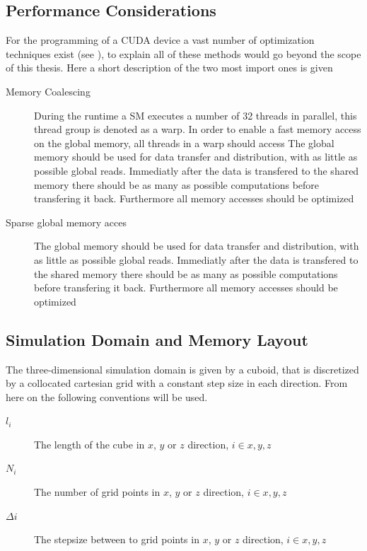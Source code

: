 \subsection{Performance Considerations}

For the programming of a CUDA device a vast number of optimization techniques exist (see \citep{CUDABP}),
to explain all of these methods would go beyond the scope of this thesis.
Here a short description of the two most import ones is given

\begin{description}
    \item[Memory Coalescing]{
        During the runtime a SM executes a number of 32 threads in parallel, this thread group is denoted as a warp.
        In order to enable a fast memory access on the global memory, all threads in a warp should access
        The global memory should be used for data transfer and distribution, with as little as possible global reads.
        Immediatly after the data is transfered to the shared memory there should be as many as possible computations before transfering
        it back. Furthermore all memory accesses should be optimized}
    \item[Sparse global memory acces]{
        The global memory should be used for data transfer and distribution, with as little as possible global reads.
        Immediatly after the data is transfered to the shared memory there should be as many as possible computations before transfering
        it back. Furthermore all memory accesses should be optimized}
\end{description}


\subsection{Simulation Domain and  Memory Layout}

The three-dimensional simulation domain is given by a cuboid, that is discretized by a
collocated cartesian grid with a constant step size in each direction.
From here on the following conventions will be used.

\begin{description}
    \item[$l_i$] The length of the cube in $x$, $y$ or $z$ direction, $i\in{x, y, z}$
    \item[$N_i$] The number of grid points in $x$, $y$ or $z$ direction, $i\in{x, y, z}$
    \item[$\Delta i$] The stepsize between to grid points in $x$, $y$ or $z$ direction, $i\in{x, y, z}$
\end{description}

